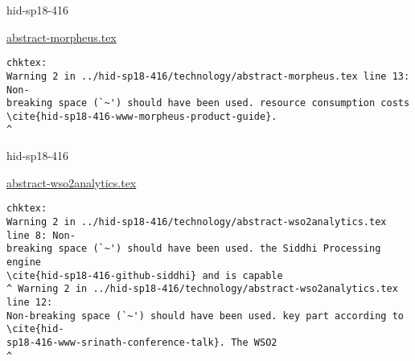 \begin{IU}

hid-sp18-416

\href{https://github.com/cloudmesh-community/hid-sp18-416/blob/master//technology/abstract-morpheus.tex}{abstract-morpheus.tex}

\begin{tiny}
\begin{verbatim}
chktex:
Warning 2 in ../hid-sp18-416/technology/abstract-morpheus.tex line 13: Non-
breaking space (`~') should have been used. resource consumption costs
\cite{hid-sp18-416-www-morpheus-product-guide}.                             ^
\end{verbatim}
\end{tiny}
\end{IU}



\begin{IU}

hid-sp18-416

\href{https://github.com/cloudmesh-community/hid-sp18-416/blob/master//technology/abstract-wso2analytics.tex}{abstract-wso2analytics.tex}

\begin{tiny}
\begin{verbatim}
chktex:
Warning 2 in ../hid-sp18-416/technology/abstract-wso2analytics.tex line 8: Non-
breaking space (`~') should have been used. the Siddhi Processing engine
\cite{hid-sp18-416-github-siddhi} and is capable
^ Warning 2 in ../hid-sp18-416/technology/abstract-wso2analytics.tex line 12:
Non-breaking space (`~') should have been used. key part according to \cite{hid-
sp18-416-www-srinath-conference-talk}. The WSO2                         ^
\end{verbatim}
\end{tiny}
\end{IU}



